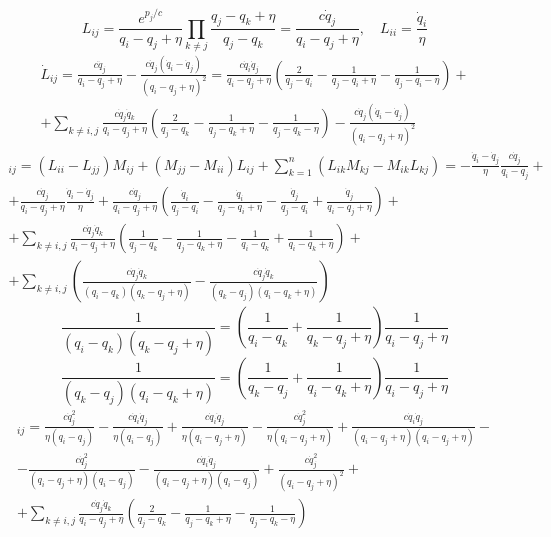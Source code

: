 \documentclass[12pt]{article}
\theoremstyle{definition}
\begin{document}
\begin{enumerate}
\begin{itemize}
\begin{equation}
            L_{ij}=\frac{e^{p_j/c}}{q_i-q_j+\eta}\prod_{k\neq j}\frac{q_j-q_k+\eta}{q_j-q_k}=\frac{c\dot{q}_j}{q_i-q_j+\eta},\quad L_{ii}=\frac{\dot{q}_i}{\eta}
        \end{equation}
        \begin{multline}
            \dot{L}_{ij}=\frac{c\ddot{q}_j}{q_i-q_j+\eta}-\frac{c\dot{q}_j(\dot{q}_i-\dot{q}_j)}{(q_i-q_j+\eta)^2}=\frac{c\dot{q}_i\dot{q}_j}{q_i-q_j+\eta}\left(\frac{2}{q_j-q_i}-\frac{1}{q_j-q_i+\eta}-\frac{1}{q_j-q_i-\eta}\right)+\\+\sum_{k\neq i,j}\frac{c\dot{q}_j\dot{q}_k}{q_i-q_j+\eta}\left(\frac{2}{q_j-q_k}-\frac{1}{q_j-q_k+\eta}-\frac{1}{q_j-q_k-\eta}\right)-\frac{c\dot{q}_j(\dot{q}_i-\dot{q}_j)}{(q_i-q_j+\eta)^2}
        \end{multline}
        \begin{multline}
            [L,M]_{ij}=(L_{ii}-L_{jj})M_{ij}+(M_{jj}-M_{ii})L_{ij}+\sum\limits_{k=1}^n(L_{ik}M_{kj}-M_{ik}L_{kj})=-\frac{\dot{q}_i-\dot{q}_j}{\eta}\frac{c\dot{q}_j}{q_i-q_j}+\\+\frac{c\dot{q}_j}{q_i-q_j+\eta}\frac{\dot{q}_i-\dot{q}_j}{\eta}+\frac{c\dot{q}_j}{q_i-q_j+\eta}\left(\frac{\dot{q}_i}{q_j-q_i}-\frac{\dot{q}_i}{q_j-q_i+\eta}-\frac{\dot{q}_j}{q_j-q_i}+\frac{\dot{q}_j}{q_i-q_j+\eta}\right)+\\+\sum\limits_{k\neq i,j}\frac{c\dot{q}_j\dot{q}_k}{q_i-q_j+\eta}\left(\frac{1}{q_j-q_k}-\frac{1}{q_j-q_k+\eta}-\frac{1}{q_i-q_k}+\frac{1}{q_i-q_k+\eta}\right)+\\+\sum\limits_{k\neq i,j}\left(\frac{c\dot{q}_j\dot{q}_k}{(q_i-q_k)(q_k-q_j+\eta)}-\frac{c\dot{q}_j\dot{q}_k}{(q_k-q_j)(q_i-q_k+\eta)}\right)
        \end{multline}
        \begin{equation}
            \frac{1}{(q_i-q_k)(q_k-q_j+\eta)}=\left(\frac{1}{q_i-q_k}+\frac{1}{q_k-q_j+\eta}\right)\frac{1}{q_i-q_j+\eta}
        \end{equation}
        \begin{equation}
            \frac{1}{(q_k-q_j)(q_i-q_k+\eta)}=\left(\frac{1}{q_k-q_j}+\frac{1}{q_i-q_k+\eta}\right)\frac{1}{q_i-q_j+\eta}
        \end{equation}
        \begin{multline}
            [L,M]_{ij}=\frac{c\dot{q}_j^2}{\eta(q_i-q_j)}-\frac{c\dot{q}_i\dot{q}_j}{\eta(q_i-q_j)}+\frac{c\dot{q}_i\dot{q}_j}{\eta(q_i-q_j+\eta)}-\frac{c\dot{q}_j^2}{\eta(q_i-q_j+\eta)}+\frac{c\dot{q}_i\dot{q}_j}{(q_i-q_j+\eta)(q_i-q_j+\eta)}-\\-\frac{c\dot{q}_j^2}{(q_i-q_j+\eta)(q_i-q_j)}-\frac{c\dot{q}_i\dot{q}_j}{(q_i-q_j+\eta)(q_i-q_j)}+\frac{c\dot{q}_j^2}{(q_i-q_j+\eta)^2}+\\+\sum\limits_{k\neq i,j}\frac{c\dot{q}_j\dot{q}_k}{q_i-q_j+\eta}\left(\frac{2}{q_j-q_k}-\frac{1}{q_j-q_k+\eta}-\frac{1}{q_j-q_k-\eta}\right)

\end{multline}
\end{itemize}
\end{enumerate}
\end{document}
